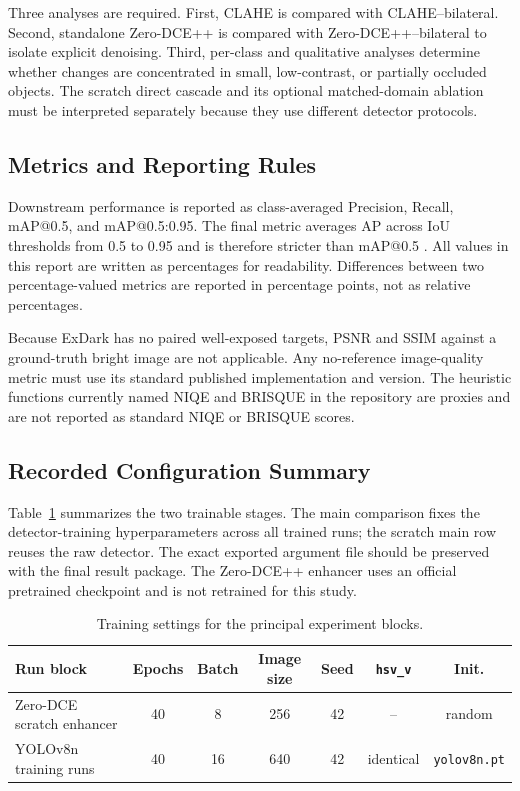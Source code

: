 \documentclass[11pt,a4paper]{article}
\begin{document}
Three analyses are required. First, CLAHE is compared with CLAHE--bilateral.
Second, standalone Zero-DCE++ is compared with Zero-DCE++--bilateral to isolate
explicit denoising. Third,
per-class and qualitative analyses determine whether changes are concentrated
in small, low-contrast, or partially occluded objects. The scratch direct cascade
and its optional matched-domain ablation must be interpreted separately because
they use different detector protocols.

\subsection{Metrics and Reporting Rules}

Downstream performance is reported as class-averaged Precision, Recall,
mAP@0.5, and mAP@0.5:0.95. The final metric averages AP across IoU thresholds
from 0.5 to 0.95 and is therefore stricter than mAP@0.5
\cite{lin2014coco}. All values in this report are written as percentages for
readability. Differences between two percentage-valued metrics are reported in
percentage points, not as relative percentages.

Because ExDark has no paired well-exposed targets, PSNR and SSIM against a
ground-truth bright image are not applicable. Any no-reference image-quality
metric must use its standard published implementation and version. The
heuristic functions currently named NIQE and BRISQUE in the repository are
proxies and are not reported as standard NIQE or BRISQUE scores.

\subsection{Recorded Configuration Summary}

Table~\ref{tab:training-settings} summarizes the two trainable stages. The main
comparison fixes the detector-training hyperparameters across all trained runs;
the scratch main row reuses the raw detector. The exact
exported argument file should be preserved with the final result package. The
Zero-DCE++ enhancer uses an official pretrained checkpoint and is not retrained
for this study.

\begin{table}[H]
\centering
\caption{Training settings for the principal experiment blocks.}
\label{tab:training-settings}
\small
\begin{tabularx}{\textwidth}{>{\raggedright\arraybackslash}Xcccccc}
\toprule
Run block & Epochs & Batch & Image size & Seed & \texttt{hsv\_v} & Init. \\
\midrule
Zero-DCE scratch enhancer & 40 & 8 & 256 & 42 & -- & random \\
YOLOv8n training runs & 40 & 16 & 640 & 42 & identical & \texttt{yolov8n.pt} \\
\bottomrule
\end{tabularx}
\end{table}
\end{document}
